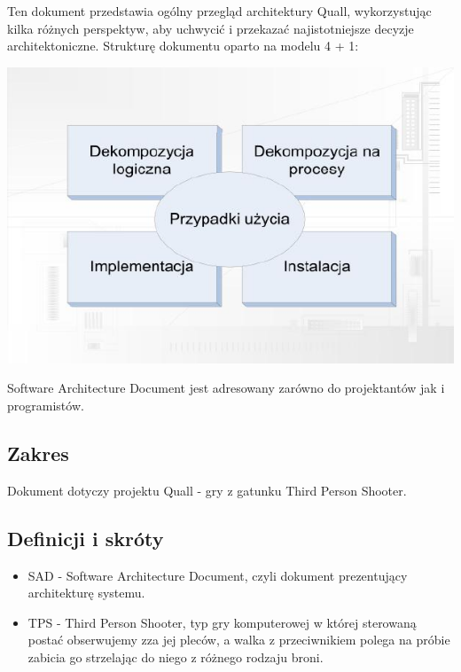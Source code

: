 \documentclass[12pt,a4paper,twoside]{article}
\begin{document}
Ten dokument przedstawia ogólny przegląd architektury Quall, wykorzystując kilka różnych perspektyw, aby uchwycić i przekazać najistotniejsze decyzje architektoniczne. Strukturę dokumentu oparto na modelu 4 + 1:

\includegraphics{pics/struktura.jpg}

Software Architecture Document jest adresowany zarówno do projektantów jak i programistów.

\subsection{Zakres}


Dokument dotyczy projektu Quall - gry z gatunku Third Person Shooter.

\subsection{Definicji i skróty}


\begin{itemize}
\item SAD - Software Architecture Document, czyli dokument prezentujący architekturę systemu.
\item TPS - Third Person Shooter, typ gry komputerowej w której sterowaną postać obserwujemy zza jej pleców, a walka z przeciwnikiem polega na próbie zabicia go strzelając do niego z różnego rodzaju broni.
\end{itemize}
\end{document}

